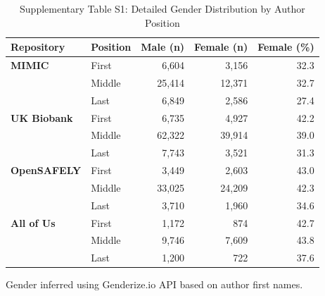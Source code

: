 \begin{table}[htbp]
\centering
\caption{Supplementary Table S1: Detailed Gender Distribution by Author Position}
\label{tab:gender_position}
\begin{tabular}{llrrr}
\toprule
Repository & Position & Male (n) & Female (n) & Female (\%) \\
\midrule
\textbf{MIMIC} & First  & 6,604  & 3,156  & 32.3 \\
               & Middle & 25,414 & 12,371 & 32.7 \\
               & Last   & 6,849  & 2,586  & 27.4 \\
\addlinespace
\textbf{UK Biobank} & First  & 6,735  & 4,927  & 42.2 \\
                    & Middle & 62,322 & 39,914 & 39.0 \\
                    & Last   & 7,743  & 3,521  & 31.3 \\
\addlinespace
\textbf{OpenSAFELY} & First  & 3,449  & 2,603  & 43.0 \\
                    & Middle & 33,025 & 24,209 & 42.3 \\
                    & Last   & 3,710  & 1,960  & 34.6 \\
\addlinespace
\textbf{All of Us}  & First  & 1,172  & 874    & 42.7 \\
                    & Middle & 9,746  & 7,609  & 43.8 \\
                    & Last   & 1,200  & 722    & 37.6 \\
\bottomrule
\end{tabular}

\smallskip
\footnotesize
Gender inferred using Genderize.io API based on author first names.
\end{table}



